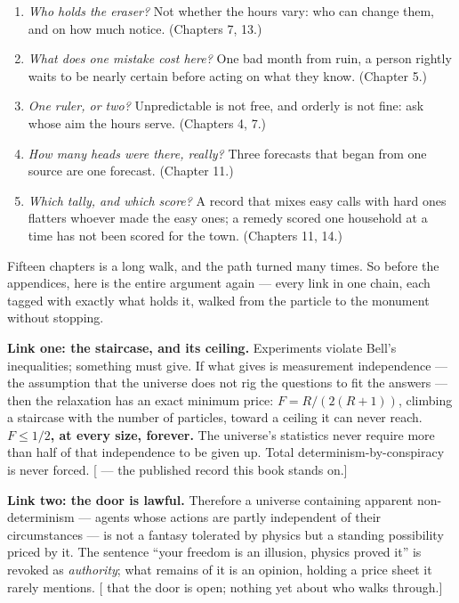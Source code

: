 \begin{enumerate}
\def\labelenumi{\arabic{enumi}.}
\tightlist
\item
  \emph{Who holds the eraser?} Not whether the hours vary: who can change
  them, and on how much notice. (Chapters 7, 13.)
\item
  \emph{What does one mistake cost here?} One bad month from ruin, a
  person rightly waits to be nearly certain before acting on what
  they know. (Chapter 5.)
\item
  \emph{One ruler, or two?} Unpredictable is not free, and orderly is not
  fine: ask whose aim the hours serve. (Chapters 4, 7.)
\item
  \emph{How many heads were there, really?} Three forecasts that began
  from one source are one forecast. (Chapter 11.)
\item
  \emph{Which tally, and which score?} A record that mixes easy calls with
  hard ones flatters whoever made the easy ones; a remedy scored one
  household at a time has not been scored for the town.
  (Chapters 11, 14.)
\end{enumerate}


Fifteen chapters is a long walk, and the path turned many times. So
before the appendices, here is the entire argument again --- every link
in one chain, each tagged with exactly what holds it, walked from the
particle to the monument without stopping.


\textbf{Link one: the staircase, and its ceiling.} Experiments violate
Bell's inequalities; something must give. If what gives is
measurement independence --- the assumption that the universe does not
rig the questions to fit the answers --- then the relaxation has an
exact minimum price: \(F = R/(2(R+1))\), climbing a staircase with the
number of particles, toward a ceiling it can never reach. \textbf{\(F \le 1/2\),
at every size, forever.} The universe's statistics never require
more than half of that independence to be given up. Total
determinism-by-conspiracy is never forced. {[} --- the published
record this book stands on.{]}

\textbf{Link two: the door is lawful.} Therefore a universe containing
apparent non-determinism --- agents whose actions are partly
independent of their circumstances --- is not a fantasy tolerated by
physics but a standing possibility priced by it. The sentence ``your
freedom is an illusion, physics proved it'' is revoked as \emph{authority};
what remains of it is an opinion, holding a price sheet it rarely
mentions. {[} that the door is open; nothing yet about who walks
through.{]}

